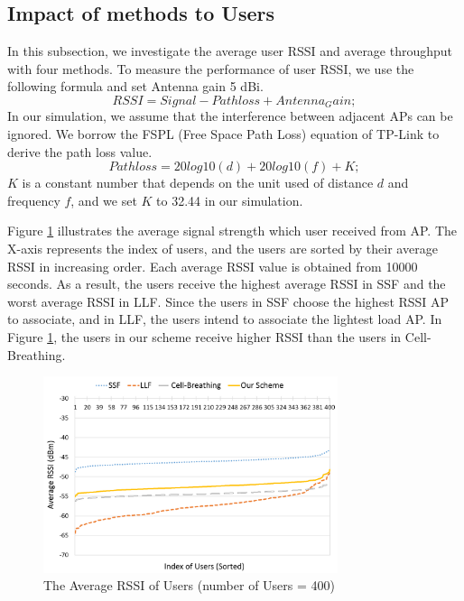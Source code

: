 \subsection{Impact of methods to Users}
In this subsection, we investigate the average user RSSI and average throughput with four methods. To measure the performance of user RSSI, we use the following formula and set Antenna gain 5 dBi.
\begin{equation}\label{RSSI}
  RSSI= Signal - Pathloss + Antenna_Gain;
\end{equation}
In our simulation, we assume that the interference between adjacent APs can be ignored. We borrow the FSPL (Free Space Path Loss) equation of TP-Link to derive the path loss value.
\begin{equation}\label{Pathloss}
  Pathloss = 20log10(d)+ 20log10(f) + K;
\end{equation}
$K$ is a constant number that depends on the unit used of distance $d$ and frequency $f$, and we set $K$ to 32.44 in our simulation.

Figure \ref{fig:Average-user-rssi} illustrates the average signal strength which user received from AP. The X-axis represents the index of users, and the users are sorted by their average RSSI in increasing order. Each average RSSI value is obtained from 10000 seconds. As a result, the users receive the highest average RSSI in SSF and the worst average RSSI in LLF. Since the users in SSF choose the highest RSSI AP to associate, and in LLF, the users intend to associate the lightest load AP. In Figure \ref{fig:Average-user-rssi}, the users in our scheme receive higher RSSI than the users in Cell-Breathing.

\begin{figure}[tbp]
\begin{center}
\includegraphics[width=3.4in]{images/Average_user_RSSI.png}
\end{center}
\caption{The Average RSSI of Users (number of Users = 400)}
\label{fig:Average-user-rssi}
\end{figure}

